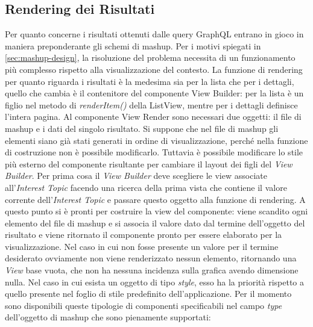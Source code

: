 \subsection{Rendering dei Risultati}\label{sec:view-risultati}

Per quanto concerne i risultati ottenuti dalle query GraphQL entrano in gioco in maniera preponderante gli schemi di mashup. Per i motivi spiegati in \ref{sec:mashup-design}, la risoluzione del problema necessita di un funzionamento più complesso rispetto alla visualizzazione del contesto. La funzione di rendering per quanto riguarda i risultati è la medesima sia per la lista che per i dettagli, quello che cambia è il contenitore del componente View Builder: per la lista è un figlio nel metodo di \emph{renderItem()} della ListView, mentre per i dettagli definisce l'intera pagina.
Al componente View Render sono necessari due oggetti: il file di mashup e i dati del singolo risultato.
Si suppone che nel file di mashup gli elementi siano già stati generati in ordine di visualizzazione, perché nella funzione di costruzione non è possibile modificarlo. Tuttavia è possibile modificare lo stile più esterno del componente risultante per cambiare il layout dei figli del \emph{View Builder}. Per prima cosa il \emph{View Builder} deve scegliere le view associate all'\emph{Interest Topic} facendo una ricerca della prima vista che contiene il valore corrente dell'\emph{Interest Topic} e passare questo oggetto alla funzione di rendering. A questo punto si è pronti per costruire la view del componente: viene scandito ogni elemento del file di mashup e si associa il valore dato dal termine dell'oggetto del risultato e viene ritornato il componente pronto per essere elaborato per la visualizzazione. Nel caso in cui non fosse presente un valore per il termine desiderato ovviamente non viene renderizzato nessun elemento, ritornando una \emph{View} base vuota, che non ha nessuna incidenza sulla grafica avendo dimensione nulla. Nel caso in cui esista un oggetto di tipo \emph{style}, esso ha la priorità rispetto a quello presente nel foglio di stile predefinito dell'applicazione. Per il momento sono disponibili queste tipologie di componenti specificabili nel campo \emph{type} dell'oggetto di mashup che sono pienamente supportati:

